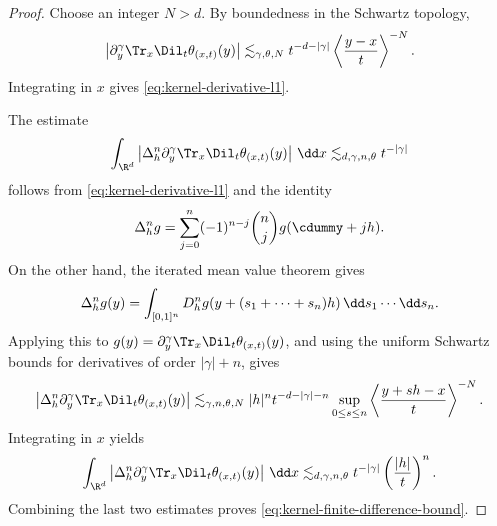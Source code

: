 \begin{proof}
  Choose an integer $N > d$. By boundedness in the Schwartz topology,
  \[ \left| \partial_y^{\gamma} \Tr_x \Dil_t \theta_{(x, t)} (y) \right|
     \lesssim_{\gamma, \theta, N} t^{- d - | \gamma |} \left\langle \frac{y -
     x}{t} \right\rangle^{- N} . \]
  Integrating in $x$ gives \eqref{eq:kernel-derivative-l1}.
  
  The estimate
  \[ \int_{\R^d} \left| \Delta_h^n \partial_y^{\gamma} \Tr_x \Dil_t
     \theta_{(x, t)} (y) \right| \hspace{0.17em} \dd x \lesssim_{d, \gamma, n,
     \theta} t^{- | \gamma |} \]
  follows from \eqref{eq:kernel-derivative-l1} and the identity
  \[ \Delta_h^n g = \sum_{j = 0}^n (- 1)^{n - j} \binom{n}{j} g (\cdummy + jh)
     . \]
  On the other hand, the iterated mean value theorem gives
  \[ \Delta_h^n g (y) = \int_{[0, 1]^n} D_h^n g (y + (s_1 + \cdots + s_n) h)
     \hspace{0.17em} \dd s_1 \cdots \dd s_n . \]
  Applying this to $g (y) = \partial_y^{\gamma} \Tr_x \Dil_t \theta_{(x, t)}
  (y)$, and using the uniform Schwartz bounds for derivatives of order $|
  \gamma | + n$, gives
  \[ \left| \Delta_h^n \partial_y^{\gamma} \Tr_x \Dil_t \theta_{(x, t)} (y)
     \right| \lesssim_{\gamma, n, \theta, N} |h|^n t^{- d - | \gamma | - n}
     \sup_{0 \le s \le n} \left\langle \frac{y + sh - x}{t} \right\rangle^{-
     N} . \]
  Integrating in $x$ yields
  \[ \int_{\R^d} \left| \Delta_h^n \partial_y^{\gamma} \Tr_x \Dil_t
     \theta_{(x, t)} (y) \right| \hspace{0.17em} \dd x \lesssim_{d, \gamma, n,
     \theta} t^{- | \gamma |} \left( \frac{|h|}{t} \right)^n . \]
  Combining the last two estimates proves
  \eqref{eq:kernel-finite-difference-bound}.
\end{proof}

